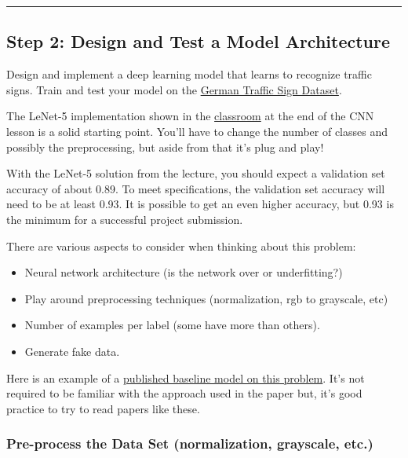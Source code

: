 \documentclass[11pt]{article}
\providecommand{\tightlist}{%
      \setlength{\itemsep}{0pt}\setlength{\parskip}{0pt}}
\begin{document}
    \begin{center}\rule{0.5\linewidth}{\linethickness}\end{center}

\subsection{Step 2: Design and Test a Model
Architecture}\label{step-2-design-and-test-a-model-architecture}

Design and implement a deep learning model that learns to recognize
traffic signs. Train and test your model on the
\href{http://benchmark.ini.rub.de/?section=gtsrb\&subsection=dataset}{German
Traffic Sign Dataset}.

The LeNet-5 implementation shown in the
\href{https://classroom.udacity.com/nanodegrees/nd013/parts/fbf77062-5703-404e-b60c-95b78b2f3f9e/modules/6df7ae49-c61c-4bb2-a23e-6527e69209ec/lessons/601ae704-1035-4287-8b11-e2c2716217ad/concepts/d4aca031-508f-4e0b-b493-e7b706120f81}{classroom}
at the end of the CNN lesson is a solid starting point. You'll have to
change the number of classes and possibly the preprocessing, but aside
from that it's plug and play!

With the LeNet-5 solution from the lecture, you should expect a
validation set accuracy of about 0.89. To meet specifications, the
validation set accuracy will need to be at least 0.93. It is possible to
get an even higher accuracy, but 0.93 is the minimum for a successful
project submission.

There are various aspects to consider when thinking about this problem:

\begin{itemize}
\tightlist
\item
  Neural network architecture (is the network over or underfitting?)
\item
  Play around preprocessing techniques (normalization, rgb to grayscale,
  etc)
\item
  Number of examples per label (some have more than others).
\item
  Generate fake data.
\end{itemize}

Here is an example of a
\href{http://yann.lecun.com/exdb/publis/pdf/sermanet-ijcnn-11.pdf}{published
baseline model on this problem}. It's not required to be familiar with
the approach used in the paper but, it's good practice to try to read
papers like these.

    \subsubsection{Pre-process the Data Set (normalization, grayscale,
etc.)}\label{pre-process-the-data-set-normalization-grayscale-etc.}
\end{document}
